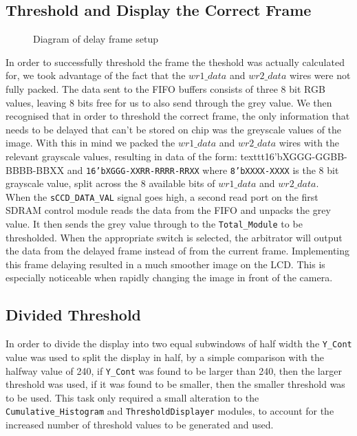 \documentclass[12pt]{article}
\begin{document}
  \subsection{Threshold and Display the Correct Frame}
    \begin{figure}[H]
    \caption{Diagram of delay frame setup}
    \label{fig:hdelyf_ram}
  \end{figure}
  
  In order to successfully threshold the frame the theshold was actually calculated for, we took advantage of the fact that the \(wr1\_data\) and \(wr2\_data\) wires were not fully packed. The data sent to the FIFO buffers consists of three 8 bit RGB values, leaving 8 bits free for us to also send through the grey value. We then recognised that in order to threshold the correct frame, the only information that needs to be delayed that can't be stored on chip was the greyscale values of the image. With this in mind we packed the \(wr1\_data\) and \(wr2\_data\) wires with the relevant grayscale values, resulting in data of the form: texttt{16'bXGGG-GGBB-BBBB-BBXX} and \texttt{16'bXGGG-XXRR-RRRR-RRXX} where \texttt{8'bXXXX-XXXX} is the 8 bit grayscale value, split across the 8 available bits of \(wr1\_data\) and \(wr2\_data\).\\

  When the \texttt{sCCD\_DATA\_VAL} signal goes high, a second read port on the first SDRAM control module reads the data from the FIFO and unpacks the grey value. It then sends the grey value through to the \texttt{Total\_Module} to be thresholded. When the appropriate switch is selected, the arbitrator will output the data from the delayed frame instead of from the current frame. Implementing this frame delaying resulted in a much smoother image on the LCD. This is especially noticeable when rapidly changing the image in front of the camera.

  \subsection{Divided Threshold}
  In order to divide the display into two equal subwindows of half width the \texttt{Y\_Cont} value was used to split the display in half, by a simple comparison with the halfway value of 240, if \texttt{Y\_Cont} was found to be larger than 240, then the larger threshold was used, if it was found to be smaller, then the smaller threshold was to be used. This task only required a small alteration to the \texttt{Cumulative\_Histogram} and \texttt{ThresholdDisplayer} modules, to account for the increased number of threshold values to be generated and used.
\end{document}
